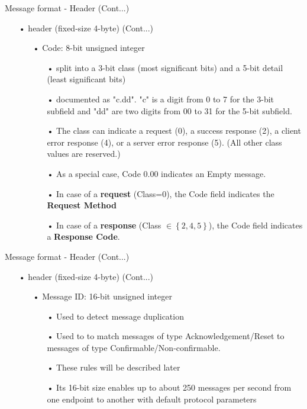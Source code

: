 \documentclass[11pt]{beamer}
\begin{document}
\begin{frame}{Message format - Header (Cont...)}
\begin{itemize}
\item[•] header (fixed-size 4-byte) (Cont...)
\begin{itemize}
\item[•] Code:  8-bit unsigned integer
\begin{itemize}
\item[•] split into a 3-bit class (most significant bits) and a 5-bit detail (least significant bits)
\item[•] documented as "c.dd". "c" is a digit from 0 to 7 for the 3-bit subfield and "dd" are two digits from 00 to 31 for the 5-bit subfield. 
\item[•] The class can indicate a request (0), a success response (2), a client error response (4), or a server error response (5).  (All other class values are reserved.)
\item[•] As a special case, Code 0.00 indicates an Empty message.
\item[•] In case of a \textbf{request} (Class=0), the Code field indicates the \textbf{Request Method}
\item[•] In case of a \textbf{response} (Class $\in \left\lbrace  2,4,5 \right\rbrace $), the Code field indicates a \textbf{Response Code}.
\end{itemize}
\end{itemize}
\end{itemize}
\end{frame}
\begin{frame}{Message format - Header (Cont...)}
\begin{itemize}
\item[•] header (fixed-size 4-byte) (Cont...)
\begin{itemize}
\item[•] Message ID:  16-bit unsigned integer
\begin{itemize}
\item[•] Used to detect message duplication
\item[•] Used to to match messages of type Acknowledgement/Reset to messages of type Confirmable/Non-confirmable.
\item[•] These rules will be described later
\item[•] Its 16-bit size enables up to about 250 messages per second from one endpoint to another with default protocol parameters
\end{itemize}
\end{itemize}
\end{itemize}
\end{frame}
\end{document}

